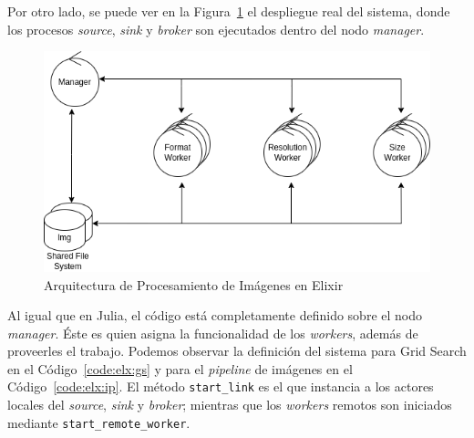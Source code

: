 \documentclass[11pt]{article}
\newcommand{\english}[1]{\textit{#1}}
\begin{document}
Por otro lado, se puede ver en la Figura~\ref{fig:elx:image_processing_arch} el despliegue real del sistema, donde los procesos \english{source}, \english{sink} y \english{broker} son ejecutados dentro del nodo \english{manager}.

\begin{figure}[ht]
    \centering
    \includegraphics[scale=0.4]{resources/distributed_systems/elixir/image_processing_arch.png}
    \caption{Arquitectura de Procesamiento de Imágenes en Elixir}
    \label{fig:elx:image_processing_arch}
\end{figure}

Al igual que en Julia, el código está completamente definido sobre el nodo \english{manager}. Éste es quien asigna la funcionalidad de los \english{workers}, además de proveerles el trabajo. Podemos observar la definición del sistema para Grid Search en el Código~\ref{code:elx:gs} y para el \english{pipeline} de imágenes en el Código~\ref{code:elx:ip}. El método \lstinline{start_link} es el que instancia a los actores locales del \english{source}, \english{sink} y \english{broker}; mientras que los \english{workers} remotos son iniciados mediante \lstinline{start_remote_worker}.
\end{document}
